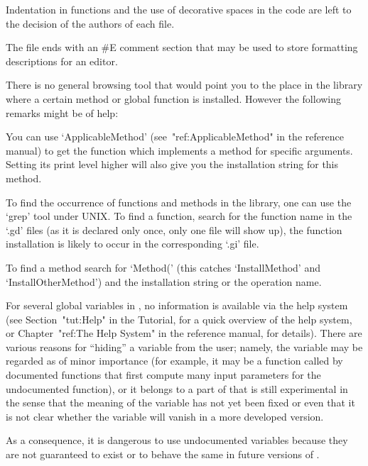 Indentation in functions and the use of decorative spaces in the code are
left to the decision of the authors of each file.

The file ends with an 
\begintt
#E
\endtt
comment section that may be used to store formatting descriptions for an
editor.


There is no general browsing tool that would point you to the place in the
library where a certain method or global function is installed. However the
following remarks might be of help:

You can use `ApplicableMethod' (see~"ref:ApplicableMethod" in the reference
manual) to get the function which implements a method for specific
arguments. Setting its print level higher will also give you the
installation string for this method.

To find the occurrence of functions and methods in the library, one can use
the `grep' tool under UNIX. To find a function, search for the function name
in the `.gd' files (as it is declared only once, only one file will show up),
the function installation is likely to occur in the corresponding `.gi' file.

To find a method search for `Method(' (this catches `InstallMethod' and
`InstallOtherMethod') and the installation string or the operation name.



For several global variables in {\GAP},
no information is available via the help system 
(see Section~"tut:Help" in the Tutorial, for a quick overview of the 
help system, or Chapter~"ref:The Help System" in the reference manual,
for details).
There are various reasons for ``hiding'' a variable from the user;
namely, the variable may be regarded as of minor importance
(for example, it may be a function called by documented {\GAP}
functions that first compute many input parameters for the undocumented
function),
or it belongs to a part of {\GAP} that is still experimental in the sense
that the meaning of the variable has not yet been fixed or even that it is
not clear whether the variable will vanish in a more developed version.

As a consequence, it is dangerous to use undocumented variables because
they are not guaranteed to exist or to behave the same in future versions
of {\GAP}.

